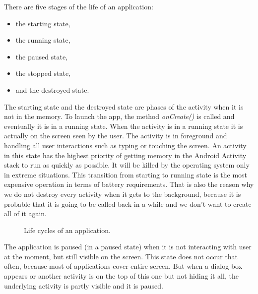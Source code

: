 There are five stages of the life of an application:
\begin{itemize}
\item the starting state,
\item the running state,
\item the paused state,
\item the stopped state,
\item and the destroyed state.
\end{itemize}

The starting state and the destroyed state are phases of the activity when it is not in the memory.
To launch the app, the method \emph{onCreate()} is called and eventually it is in a running state.
When the activity is in a running state it is actually on the screen seen by the user.
The activity is in foreground and handling all user interactions such as typing or touching the screen.
An activity in this state has the highest priority of getting memory in the Android Activity stack to run as quickly as possible.
It will be killed by the operating system only in extreme situations.
This transition from starting to running state is the most expensive operation in terms of battery requirements.
That is also the reason why we do not destroy every activity when it gets to the background, 
because it is probable that it is going to be called back in a while and we don't want to create all of it again.

\begin{figure}[h!]
    \caption{Life cycles of an application.}
\end{figure}

The application is paused (in a paused state) when it is not interacting with user at the moment, but still visible on the screen.
This state does not occur that often, because most of applications cover entire screen.
But when a dialog box appears or another activity is on the top of this one but not hiding it all, the underlying activity is partly visible and it is paused.

